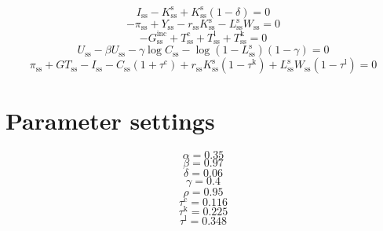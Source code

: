 \begin{equation}
I_\mathrm{ss} - K^{\mathrm{s}}_\mathrm{ss} + {K^{\mathrm{s}}_\mathrm{ss}} \left(1 - \delta\right) = 0
\end{equation}
\begin{equation}
-\pi_\mathrm{ss} + Y_\mathrm{ss} - {r_\mathrm{ss}} {K^{\mathrm{s}}_\mathrm{ss}} - {L^{\mathrm{s}}_\mathrm{ss}} {W_\mathrm{ss}} = 0
\end{equation}
\begin{equation}
-G^{\mathrm{inc}}_\mathrm{ss} + T^{\mathrm{c}}_\mathrm{ss} + T^{\mathrm{l}}_\mathrm{ss} + T^{\mathrm{k}}_\mathrm{ss} = 0
\end{equation}
\begin{equation}
U_\mathrm{ss} - {\beta} {U_\mathrm{ss}} - {\gamma} {\log{C_\mathrm{ss}}} - {\log\left(1 - L^{\mathrm{s}}_\mathrm{ss}\right)} \left(1 - \gamma\right) = 0
\end{equation}
\begin{equation}
\pi_\mathrm{ss} + {G\!T}_\mathrm{ss} - I_\mathrm{ss} - {C_\mathrm{ss}} \left(1 + \tau^{\mathrm{c}}\right) + {r_\mathrm{ss}} {K^{\mathrm{s}}_\mathrm{ss}} \left(1 - \tau^{\mathrm{k}}\right) + {L^{\mathrm{s}}_\mathrm{ss}} {W_\mathrm{ss}} \left(1 - \tau^{\mathrm{l}}\right) = 0
\end{equation}






\section{Parameter settings}

\begin{equation}
\alpha = 0.35
\end{equation}
\begin{equation}
\beta = 0.97
\end{equation}
\begin{equation}
\delta = 0.06
\end{equation}
\begin{equation}
\gamma = 0.4
\end{equation}
\begin{equation}
\rho = 0.95
\end{equation}
\begin{equation}
\tau^{\mathrm{c}} = 0.116
\end{equation}
\begin{equation}
\tau^{\mathrm{k}} = 0.225
\end{equation}
\begin{equation}
\tau^{\mathrm{l}} = 0.348
\end{equation}


